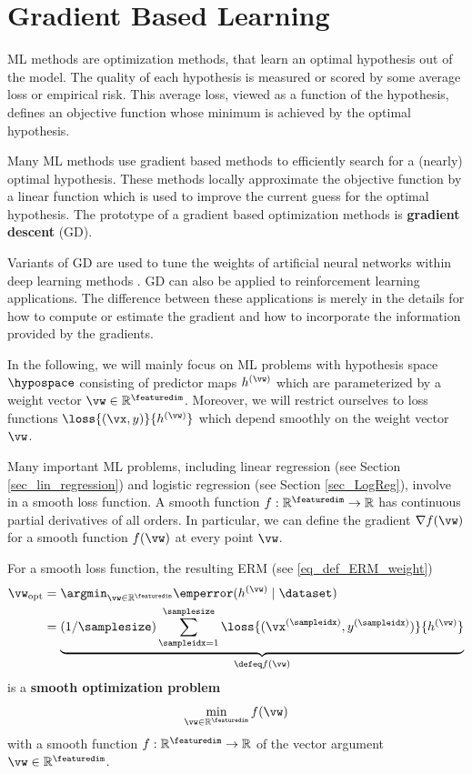 \documentclass[12pt]{report}
\begin{document}
\newpage
\chapter{Gradient Based Learning}
\label{ch_GD}

ML methods are optimization methods, that learn an optimal 
hypothesis out of the model. The quality of each hypothesis is 
measured or scored by some average loss or empirical risk. This
average loss, viewed as a function of the hypothesis, defines 
an objective function whose minimum is achieved by the 
optimal hypothesis. 

Many ML methods use gradient based methods to efficiently search 
for a (nearly) optimal hypothesis. These methods locally 
approximate the objective function by a linear function which 
is used to improve the current guess for the optimal hypothesis. 
The prototype of a gradient based optimization methods is 
{\bf gradient descent} (GD). 

Variants of GD are used to tune the weights of artificial neural 
networks within deep learning methods \cite{Goodfellow-et-al-2016}. 
GD can also be applied to reinforcement learning applications. The 
difference between these applications is merely in the details for 
how to compute or estimate the gradient and how to incorporate 
the information provided by the gradients. 

In the following, we will mainly focus on ML problems with hypothesis 
space $\hypospace$ consisting of predictor maps $h^{(\vw)}$ 
which are parameterized by a weight vector $\vw \in \mathbb{R}^{\featuredim}$. 
Moreover, we will restrict ourselves to loss functions $\loss{(\vx,y)}{h^{(\vw)}}$ 
which depend smoothly on the weight vector $\vw$. 

Many important ML problems, including linear regression (see Section \ref{sec_lin_regression}) 
and logistic regression (see Section \ref{sec_LogReg}), involve in a smooth loss 
function. A smooth function $f: \mathbb{R}^{\featuredim} \rightarrow \mathbb{R}$ 
has continuous partial derivatives of all orders. In particular, we can define the 
gradient $\nabla f(\vw)$ for a smooth function $f(\vw)$ at every point $\vw$.

For a smooth loss function, the resulting ERM (see \eqref{eq_def_ERM_weight})  
\begin{align}
\label{equ_def_ERM_continous}
\vw_{\rm opt} & = \argmin_{\vw \in \mathbb{R}^{\featuredim}}  \emperror( h^{(\vw)} \mid \dataset)  \nonumber \\
& = \underbrace{(1/\samplesize) \sum_{\sampleidx=1}^{\samplesize} \loss{(\vx^{(\sampleidx)},y^{(\sampleidx)})}{h^{(\vw)}}}_{\defeq f(\vw)} 
\end{align} 
is a {\bf smooth optimization problem}
\begin{equation}
\label{equ_generic_smooth_problem}
\min_{\vw \in \mathbb{R}^{\featuredim}} f(\vw)
\end{equation} 
with a smooth function $f: \mathbb{R}^{\featuredim} \rightarrow \mathbb{R}$ of 
the vector argument $\vw \in \mathbb{R}^{\featuredim}$. 
\end{document}
